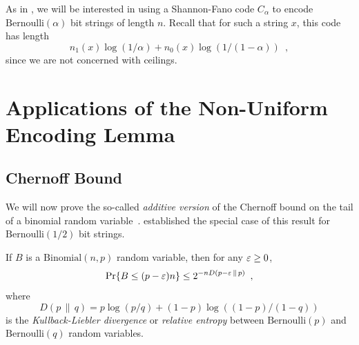 \documentclass[prodmode,acmcsur]{acmsmall}
\begin{document}
As in , we will be interested in using a
Shannon-Fano code $C_\alpha$ to encode $\mathrm{Bernoulli}(\alpha)$
bit strings of length $n$. Recall that for such a string $x$, this
code has length
\[
  n_1(x) \log (1/\alpha) + n_0(x) \log(1/(1 - \alpha)) \enspace ,
\]
since we are not concerned with ceilings.

\section{Applications of the Non-Uniform Encoding Lemma}

\subsection{Chernoff Bound}

We will now prove the so-called \emph{additive version} of the
Chernoff bound on the tail of a binomial random
variable~\cite{chernoff:bound}.  established
the special case of this result for $\mathrm{Bernoulli}(1/2)$ bit
strings.

\begin{thm}
  If $B$ is a $\mathrm{Binomial}(n,p)$ random variable, then for any
  $\varepsilon \geq 0$,
  \[
    \Pr\{B\le(p-\varepsilon)n\} \le 2^{-nD(p-\varepsilon \,\|\, p)} \enspace ,
  \]
  where 
  \[ 
    D(p\, \|\, q)= p\log (p/q) + (1-p)\log ((1 - p)/(1 - q))
  \]
  is the \emph{Kullback-Liebler divergence} or \emph{relative entropy}
  between $\mathrm{Bernoulli}(p)$ and $\mathrm{Bernoulli}(q)$ random
  variables.
\end{thm}
\end{document}
